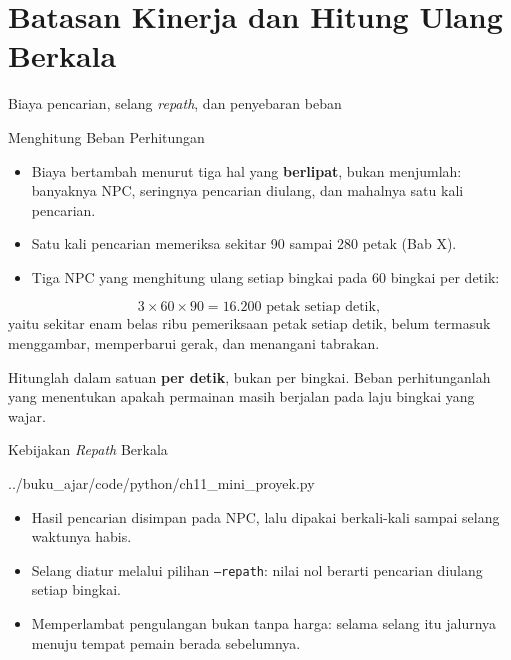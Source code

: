 \documentclass[aspectratio=169,10pt]{beamer}
\begin{document}
\section{Batasan Kinerja dan Hitung Ulang Berkala}
  {Biaya pencarian, selang \emph{repath}, dan penyebaran beban}

\begin{frame}{Menghitung Beban Perhitungan}
\begin{itemize}
  \item Biaya bertambah menurut tiga hal yang \textbf{berlipat}, bukan
        menjumlah: banyaknya NPC, seringnya pencarian diulang, dan mahalnya
        satu kali pencarian.
  \item Satu kali pencarian memeriksa sekitar 90 sampai 280 petak (Bab X).
  \item Tiga NPC yang menghitung ulang setiap bingkai pada 60 bingkai per detik:
\end{itemize}
\[
  3 \times 60 \times 90 = 16.200 \text{ petak setiap detik},
\]
yaitu sekitar enam belas ribu pemeriksaan petak setiap detik, belum termasuk
menggambar, memperbarui gerak, dan menangani tabrakan.
\begin{kotak}
Hitunglah dalam satuan \textbf{per detik}, bukan per bingkai. Beban
perhitunganlah yang menentukan apakah permainan masih berjalan pada laju
bingkai yang wajar.
\end{kotak}
\end{frame}

\begin{frame}[fragile]{Kebijakan \emph{Repath} Berkala}

  {../buku_ajar/code/python/ch11_mini_proyek.py}
\vspace{0.10cm}
\begin{itemize}
  \item Hasil pencarian disimpan pada NPC, lalu dipakai berkali-kali sampai
        selang waktunya habis.
  \item Selang diatur melalui pilihan \texttt{--repath}: nilai nol berarti
        pencarian diulang setiap bingkai.
  \item Memperlambat pengulangan bukan tanpa harga: selama selang itu jalurnya
        menuju tempat pemain berada sebelumnya.
\end{itemize}
\end{frame}
\end{document}
